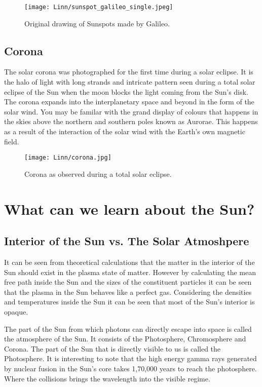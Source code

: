 \documentclass{../template/texnote}
\begin{document}
\begin{figure}[htpb]
    \centering
    \texttt{[image: Linn/sunspot\_galileo\_single.jpeg]}
    \caption{Original drawing of Sunspots made by Galileo.} 
    \label{fig:sunspot}
\end{figure}

\subsection{Corona}
The solar corona was photographed for the first time during a solar eclipse. It is the halo of light with long strands and intricate pattern seen during a total solar eclipse of the Sun when the moon blocks the light coming from the Sun's disk. 
The corona expands into the interplanetary space and beyond in the form of the solar wind.
You may be familar with the grand display of colours that happens in the skies above the northern and southern poles known as Aurorae.
This happens as a result of the interaction of the solar wind with the Earth's own magnetic field.
\begin{figure}[htpb]
    \centering
    \texttt{[image: Linn/corona.jpg]}
    \caption{Corona as observed during a total solar eclipse.} 
    \label{fig:corona}
\end{figure}

\section{What can we learn about the Sun?} 
\subsection{Interior of the Sun vs. The Solar Atmoshpere}
It can be seen from theoretical calculations that the matter in the interior of the Sun should exist in the plasma state of matter. 
However by calculating the mean free path inside the Sun and the sizes of the constituent particles it can be seen that the plasma in the Sun
behaves like a perfect gas.
Considering the densities and temperatures inside the Sun it can be seen that most of the Sun's interior is opaque. 

The part of the Sun from which photons can directly escape into space is called the atmosphere of the Sun.
It consists of the Photosphere, Chromosphere and Corona.
The part of the Sun that is directly visible to us is called the Photosphere.
It is interesting to note that the high energy gamma rays generated by nuclear fusion in the Sun's core takes 1,70,000 years to reach the photosphere. Where the collisions brings the wavelength into the visible regime.
\end{document}

